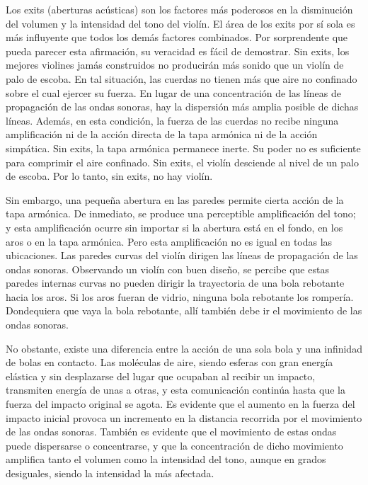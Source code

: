 \documentclass[12pt]{book}
\begin{document}
Los exits (aberturas acústicas) son los factores más poderosos en la disminución del volumen y la intensidad del tono del violín. El área de los exits por sí sola es más influyente que todos los demás factores combinados. Por sorprendente que pueda parecer esta afirmación, su veracidad es fácil de demostrar. Sin exits, los mejores violines jamás construidos no producirán más sonido que un violín de palo de escoba. En tal situación, las cuerdas no tienen más que aire no confinado sobre el cual ejercer su fuerza. En lugar de una concentración de las líneas de propagación de las ondas sonoras, hay la dispersión más amplia posible de dichas líneas. Además, en esta condición, la fuerza de las cuerdas no recibe ninguna amplificación ni de la acción directa de la tapa armónica ni de la acción simpática. Sin exits, la tapa armónica permanece inerte. Su poder no es suficiente para comprimir el aire confinado. Sin exits, el violín desciende al nivel de un palo de escoba. Por lo tanto, sin exits, no hay violín. 

Sin embargo, una pequeña abertura en las paredes permite cierta acción de la tapa armónica. De inmediato, se produce una perceptible amplificación del tono; y esta amplificación ocurre sin importar si la abertura está en el fondo, en los aros o en la tapa armónica. Pero esta amplificación no es igual en todas las ubicaciones. Las paredes curvas del violín dirigen las líneas de propagación de las ondas sonoras. Observando un violín con buen diseño, se percibe que estas paredes internas curvas no pueden dirigir la trayectoria de una bola rebotante hacia los aros. Si los aros fueran de vidrio, ninguna bola rebotante los rompería. Dondequiera que vaya la bola rebotante, allí también debe ir el movimiento de las ondas sonoras. 

No obstante, existe una diferencia entre la acción de una sola bola y una infinidad de bolas en contacto. Las moléculas de aire, siendo esferas con gran energía elástica y sin desplazarse del lugar que ocupaban al recibir un impacto, transmiten energía de unas a otras, y esta comunicación continúa hasta que la fuerza del impacto original se agota. Es evidente que el aumento en la fuerza del impacto inicial provoca un incremento en la distancia recorrida por el movimiento de las ondas sonoras. También es evidente que el movimiento de estas ondas puede dispersarse o concentrarse, y que la concentración de dicho movimiento amplifica tanto el volumen como la intensidad del tono, aunque en grados desiguales, siendo la intensidad la más afectada. 
\end{document}
